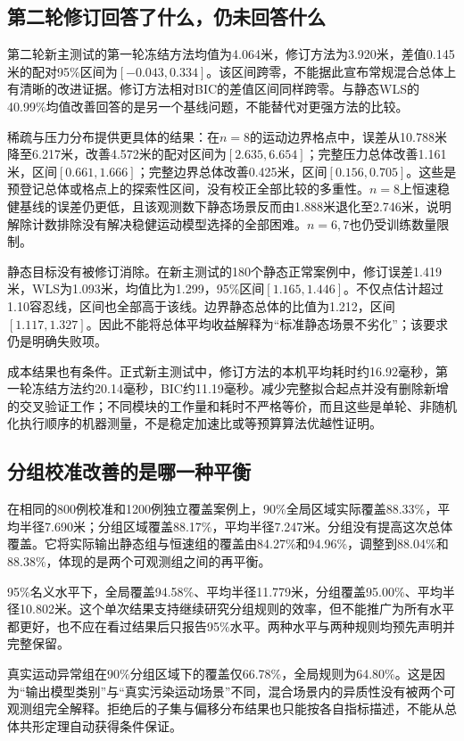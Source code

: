 \subsection{第二轮修订回答了什么，仍未回答什么}

第二轮新主测试的第一轮冻结方法均值为4.064米，修订方法为3.920米，差值0.145米的配对95\%区间为$[-0.043,0.334]$。该区间跨零，不能据此宣布常规混合总体上有清晰的改进证据。修订方法相对BIC的差值区间同样跨零。与静态WLS的40.99\%均值改善回答的是另一个基线问题，不能替代对更强方法的比较。

稀疏与压力分布提供更具体的结果：在$n=8$的运动边界格点中，误差从10.788米降至6.217米，改善4.572米的配对区间为$[2.635,6.654]$；完整压力总体改善1.161米，区间$[0.661,1.666]$；完整边界总体改善0.425米，区间$[0.156,0.705]$。这些是预登记总体或格点上的探索性区间，没有校正全部比较的多重性。$n=8$上恒速稳健基线的误差仍更低，且该观测数下静态场景反而由1.888米退化至2.746米，说明解除计数排除没有解决稳健运动模型选择的全部困难。$n=6,7$也仍受训练数量限制。

静态目标没有被修订消除。在新主测试的180个静态正常案例中，修订误差1.419米，WLS为1.093米，均值比为1.299，95\%区间$[1.165,1.446]$。不仅点估计超过1.10容忍线，区间也全部高于该线。边界静态总体的比值为1.212，区间$[1.117,1.327]$。因此不能将总体平均收益解释为“标准静态场景不劣化”；该要求仍是明确失败项。

成本结果也有条件。正式新主测试中，修订方法的本机平均耗时约16.92毫秒，第一轮冻结方法约20.14毫秒，BIC约11.19毫秒。减少完整拟合起点并没有删除新增的交叉验证工作；不同模块的工作量和耗时不严格等价，而且这些是单轮、非随机化执行顺序的机器测量，不是稳定加速比或等预算算法优越性证明。

\subsection{分组校准改善的是哪一种平衡}
在相同的800例校准和1200例独立覆盖案例上，90\%全局区域实际覆盖88.33\%，平均半径7.690米；分组区域覆盖88.17\%，平均半径7.247米。分组没有提高这次总体覆盖。它将实际输出静态组与恒速组的覆盖由84.27\%和94.96\%，调整到88.04\%和88.38\%，体现的是两个可观测组之间的再平衡。

95\%名义水平下，全局覆盖94.58\%、平均半径11.779米，分组覆盖95.00\%、平均半径10.802米。这个单次结果支持继续研究分组规则的效率，但不能推广为所有水平都更好，也不应在看过结果后只报告95\%水平。两种水平与两种规则均预先声明并完整保留。

真实运动异常组在90\%分组区域下的覆盖仅66.78\%，全局规则为64.80\%。这是因为“输出模型类别”与“真实污染运动场景”不同，混合场景内的异质性没有被两个可观测组完全解释。拒绝后的子集与偏移分布结果也只能按各自指标描述，不能从总体共形定理自动获得条件保证。

